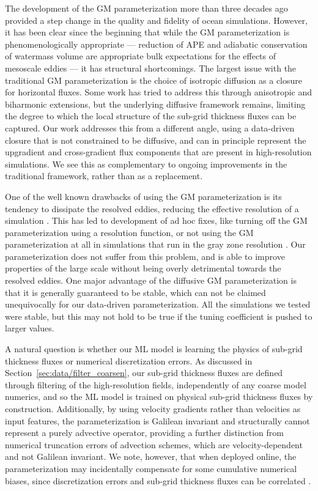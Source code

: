 \documentclass[draft]{agujournal2019}
\begin{document}
The development of the GM parameterization more than three decades ago provided a step change in the quality and fidelity of ocean simulations. However, it has been clear since the beginning that while the GM parameterization is phenomenologically appropriate --- reduction of APE and adiabatic conservation of watermass volume are appropriate bulk expectations for the effects of mesoscale eddies --- it has structural shortcomings. The largest issue with the traditional GM parameterization is the choice of isotropic diffusion as a closure for horizontal fluxes. Some work has tried to address this through anisotropic \cite{smith2004anisotropic} and biharmonic \cite{eden2023simple} extensions, but the underlying diffusive framework remains, limiting the degree to which the local structure of the sub-grid thickness fluxes can be captured. Our work addresses this from a different angle, using a data-driven closure that is not constrained to be diffusive, and can in principle represent the upgradient and cross-gradient flux components that are present in high-resolution simulations. We see this as complementary to ongoing improvements in the traditional framework, rather than as a replacement.

One of the well known drawbacks of using the GM parameterization is its tendency to dissipate the resolved eddies, reducing the effective resolution of a simulation \cite{hallberg2013using, mak2023scale}. This has led to development of ad hoc fixes, like turning off the GM parameterization using a resolution function, or not using the GM parameterization at all in simulations that run in the gray zone resolution \cite{adcroft2019gfdl}. Our parameterization does not suffer from this problem, and is able to improve properties of the large scale without being overly detrimental towards the resolved eddies. One major advantage of the diffusive GM parameterization is that it is generally guaranteed to be stable, which can not be claimed unequivocally for our data-driven parameterization. All the simulations we tested were stable, but this may not hold to be true if the tuning coefficient is pushed to larger values. 


A natural question is whether our ML model is learning the physics of sub-grid thickness fluxes or numerical discretization errors. As discussed in Section~\ref{sec:data/filter_coarsen}, our sub-grid thickness fluxes are defined through filtering of the high-resolution fields, independently of any coarse model numerics, and so the ML model is trained on physical sub-grid thickness fluxes by construction. Additionally, by using velocity gradients rather than velocities as input features, the parameterization is Galilean invariant and structurally cannot represent a purely advective operator, providing a further distinction from numerical truncation errors of advection schemes, which are velocity-dependent and not Galilean invariant. We note, however, that when deployed online, the parameterization may incidentally compensate for some cumulative numerical biases, since discretization errors and sub-grid thickness fluxes can be correlated \cite{lund2003use}.
\end{document}

